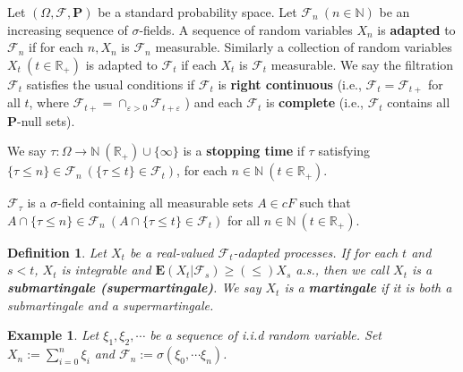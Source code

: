 \documentclass[twoside, 12pt]{book}
\numberwithin{equation}{chapter}
\newtheorem{definition}[theorem]{Definition}
\newtheorem{example}{Example}
\def\cF{{\mathcal F}}
\def\mN{{\mathbb N}}
\def\mR{{\mathbb R}}
\def\bE{{\mathbf E}}
\def\bP{{\mathbf P}}
\def\geq{\geqslant}
\def\leq{\leqslant}
\begin{document}
	
	Let $(\Omega, \cF, \bP)$ be a standard probability space. Let $\mathcal{F}_n\ (n\in \mN)$ be an increasing sequence of $\sigma$-fields. A sequence of random variables $X_n$ is {\bf adapted} to $\mathcal{F}_n$ if for each $n, X_n$ is $\mathcal{F}_n$ measurable. Similarly a collection of random variables $X_t\ (t\in \mR_+)$ is adapted to $\mathcal{F}_t$ if each $X_t$ is $\mathcal{F}_t$ measurable. We say the filtration $\mathcal{F}_t$ satisfies the usual conditions if $\mathcal{F}_t$ is {\bf right continuous} (i.e., $\mathcal{F}_t=\mathcal{F}_{t+}$ for all $t$, where $\mathcal{F}_{t+}=\cap_{\varepsilon>0} \mathcal{F}_{t+\varepsilon}$ ) and each $\mathcal{F}_t$ is {\bf complete} (i.e., $\mathcal{F}_t$ contains all $\mathbf{P}$-null sets). %
	 
	We say $\tau: \Omega\to \mN \ (\mR_+) \cup\{\infty\}$ is a {\bf stopping time} if $\tau$ satisfying $\{\tau\leq n\}\in \cF_n \ (\{\tau\leq t\}\in \cF_t)$, for each $n\in \mN \ (t\in \mR_+)$.  
	 
	$\mathcal{F}_\tau$ is a $\sigma$-field containing all measurable sets $A\in cF$ such that $A \cap \{\tau \leq n\} \in \mathcal{F}_n\ (A \cap \{\tau \leq t\} \in\cF_t)$ for all $n\in \mN\ (t \in \mR_+)$. 
		
	\begin{definition}
		Let $X_t$ be a real-valued $\cF_t$-adapted processes. If for each $t$ and $s<t$, $X_t$ is integrable and $\bE(X_t | \cF_s) \geq (\leq) X_s$ a.s., then we call $X_t$ is a {\bf submartingale (supermartingale)}. We say $X_t$ is a {\bf martingale} if it is both a submartingale and a supermartingale. 
	\end{definition}
	
	\begin{example}
		Let $\xi_1, \xi_2, \cdots$ be a sequence of i.i.d random variable. Set $X_n:=\sum_{i=0}^n \xi_i$ and $\cF_n:=\sigma(\xi_0,\cdots \xi_n)$. 
	\end{example}
	
\end{document}
